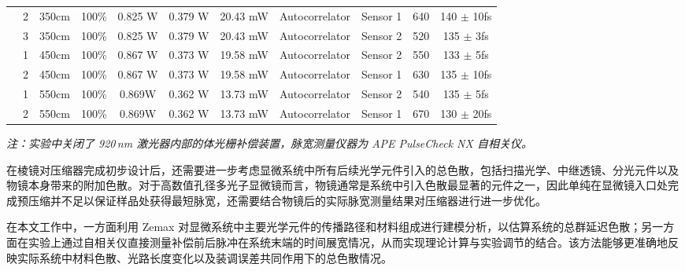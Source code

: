 \begin{table}[htbp]
{\begin{tabular}{ccccccccccc}
\rowcolor[HTML]{E7EAED} 
\cellcolor[HTML]{E7EAED} &
  2 &
  \cellcolor[HTML]{83CBEB}350cm &
  100\% &
  0.825 W &
  0.379 W &
  20.43 mW &
  Autocorrelator &
  Sensor 1 &
  640 &
  140 $\pm$ 10fs \\
\rowcolor[HTML]{E7EAED} 
\multirow{-3}{*}{\cellcolor[HTML]{E7EAED}2} &
  3 &
  \cellcolor[HTML]{83CBEB}350cm &
  100\% &
  0.825 W &
  0.379 W &
  20.43 mW &
  Autocorrelator &
  Sensor 2 &
  520 &
  135 $\pm$ 3fs \\ \hline
\rowcolor[HTML]{E7EAED} 
\cellcolor[HTML]{E7EAED} &
  1 &
  \cellcolor[HTML]{E59EDD}450cm &
  100\% &
  0.867 W &
  0.373 W &
  19.58 mW &
  Autocorrelator &
  Sensor 2 &
  550 &
  133 $\pm$ 5fs \\
\rowcolor[HTML]{E7EAED} 
\multirow{-2}{*}{\cellcolor[HTML]{E7EAED}3} &
  2 &
  \cellcolor[HTML]{E59EDD}450cm &
  100\% &
  0.867 W &
  0.373 W &
  19.58 mW &
  Autocorrelator &
  Sensor 1 &
  630 &
  135 $\pm$ 10fs \\ \hline
\rowcolor[HTML]{E7EAED} 
\cellcolor[HTML]{E7EAED} &
  1 &
  \cellcolor[HTML]{8ED973}550cm &
  100\% &
  0.869W &
  0.362 W &
  13.73 mW &
  Autocorrelator &
  Sensor 2 &
  540 &
  135 $\pm$ 5fs \\
\rowcolor[HTML]{E7EAED} 
\multirow{-2}{*}{\cellcolor[HTML]{E7EAED}4} &
  2 &
  \cellcolor[HTML]{8ED973}550cm &
  100\% &
  0.869W &
  0.362 W &
  13.73 mW &
  Autocorrelator &
  Sensor 1 &
  670 &
  130 $\pm$ 20fs \\ \hline
\end{tabular}%
}
\vspace{2mm}
\begin{minipage}{\textwidth}
\footnotesize
\textit{注：实验中关闭了 920\,nm 激光器内部的体光栅补偿装置，脉宽测量仪器为 APE PulseCheck NX 自相关仪。}
\end{minipage}
\end{table}

在棱镜对压缩器完成初步设计后，还需要进一步考虑显微系统中所有后续光学元件引入的总色散，包括扫描光学、中继透镜、分光元件以及物镜本身带来的附加色散。对于高数值孔径多光子显微镜而言，物镜通常是系统中引入色散最显著的元件之一，因此单纯在显微镜入口处完成预压缩并不足以保证样品处获得最短脉宽，还需要结合物镜后的实际脉宽测量结果对压缩器进行进一步优化。

在本文工作中，一方面利用 Zemax 对显微系统中主要光学元件的传播路径和材料组成进行建模分析，以估算系统的总群延迟色散；另一方面在实验上通过自相关仪直接测量补偿前后脉冲在系统末端的时间展宽情况，从而实现理论计算与实验调节的结合。该方法能够更准确地反映实际系统中材料色散、光路长度变化以及装调误差共同作用下的总色散情况。


